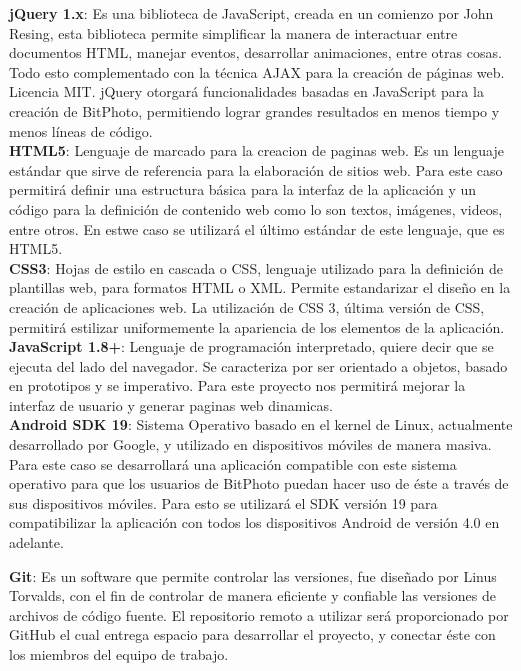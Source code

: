 \documentclass{memoria}
\begin{document}
\textbf{jQuery 1.x}: Es una biblioteca de JavaScript, creada en un comienzo por John Resing, esta biblioteca permite simplificar la manera de interactuar entre documentos HTML, manejar eventos, desarrollar animaciones, entre otras cosas. Todo esto complementado con la técnica AJAX para la creación de páginas web. Licencia MIT. jQuery otorgará funcionalidades basadas en JavaScript para la creación de BitPhoto, permitiendo lograr grandes resultados en menos tiempo y menos líneas de código.\\

\textbf{HTML5}: Lenguaje de marcado para la creacion de paginas web. Es un lenguaje estándar que sirve de referencia para la elaboración de sitios web. Para este caso permitirá definir una estructura básica para la interfaz de la aplicación y un código para la definición de contenido web como lo son textos, imágenes, videos, entre otros. En estwe caso se utilizará el último estándar de este lenguaje, que es HTML5.\\

\textbf{CSS3}: Hojas de estilo en cascada o CSS, lenguaje utilizado para la definición de plantillas web, para formatos HTML o XML. Permite estandarizar el diseño en la creación de aplicaciones web. La utilización de CSS 3, última versión de CSS, permitirá estilizar uniformemente la apariencia de los elementos de la aplicación.\\

\textbf{JavaScript 1.8+}: Lenguaje de programación interpretado, quiere decir que se ejecuta del lado del navegador. Se caracteriza por ser orientado a objetos, basado en prototipos y se imperativo. Para este proyecto nos permitirá mejorar la interfaz de usuario y generar paginas web dinamicas.\\

\textbf{Android SDK 19}: Sistema Operativo basado en el kernel de Linux, actualmente desarrollado por Google, y utilizado en dispositivos móviles de manera masiva. Para este caso se desarrollará una aplicación compatible con este sistema operativo para que los usuarios de BitPhoto puedan hacer uso de éste a través de sus dispositivos móviles. Para esto se utilizará el SDK versión 19 para compatibilizar la aplicación con todos los dispositivos Android de versión 4.0 en adelante.\\


\textbf{Git}: Es un software que permite controlar las versiones, fue diseñado por Linus Torvalds, con el fin de controlar de manera eficiente y confiable las versiones de archivos de código fuente. El repositorio remoto a utilizar será proporcionado por GitHub el cual entrega espacio para desarrollar el proyecto, y conectar éste con los miembros del equipo de trabajo.\\
\end{document}

